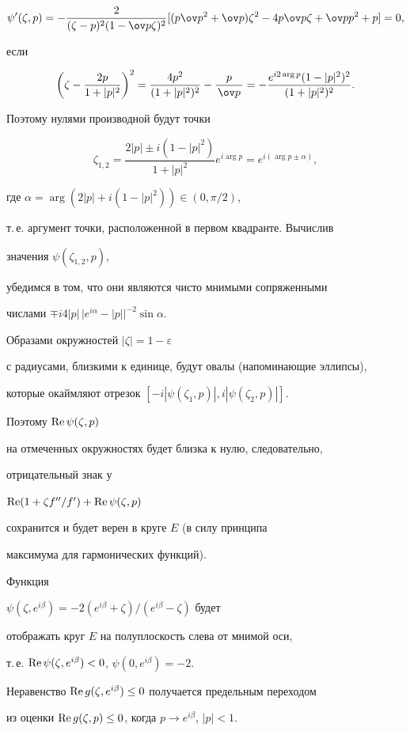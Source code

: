 \begin{pf}
$$ 


\psi'(\zeta,p)=-\frac{2}{(\zeta-p)^2(1-\ov p\zeta)^2} 


[(p\ov p{}^2+\ov p)\zeta^2-4p\ov p\zeta+ 


\ov p p^2+p]=0, 


$$ 


если 


$$ 


\bigg(\zeta-\frac{2p}{1+|p|^2} \bigg)^2= 


\frac{4p^2}{(1+|p|^2)^2}-\frac{p}{\,\ov p\,}=- 


\frac{e^{i2\arg p}(1-|p|^2)^2}{(1+|p|^2)^2}. 


$$ 


Поэтому нулями производной будут точки 


$$ 


\zeta_{1,2}=\frac{2|p|\pm i(1-|p|^2)}{1+|p|^2} 


e^{i\arg p}=e^{i(\arg p\pm\alpha)}, 


$$ 


где $\alpha=\arg(2|p|+i(1-|p|^2))\in(0,\pi/2)$, 


т.\,е. аргумент точки, расположенной в первом квадранте. Вычислив 


значения $\psi(\zeta_{1,2},p)$, 


убедимся в том, что они являются чисто мнимыми сопряженными 


числами $\mp i4|p|\,\big|e^{i\alpha}-|p|\big|^{-2}\sin\alpha$. 


 


Образами окружностей $|\zeta|=1-\varepsilon$ 


с радиусами, близкими к единице, будут овалы (напоминающие эллипсы), 


которые окаймляют отрезок $[-i|\psi(\zeta_1,p)|,i|\psi(\zeta_2,p)|]$. 


Поэтому $\operatorname{Re}\psi(\zeta,p)$ 


на отмеченных окружностях будет близка к нулю, следовательно, 


отрицательный знак у 


$\operatorname{Re}(1+\zeta f''/f')+ \operatorname{Re}\psi(\zeta,p)$ 


сохранится и будет верен в круге $E$ (в силу принципа 


максимума для гармонических функций). 


 


Функция 


$\psi(\zeta,e^{i\beta})=-2(e^{i\beta}+\zeta)/(e^{i\beta}-\zeta)$ будет 


отображать круг $E$ на полуплоскость слева от мнимой оси, 


т.\,е. $\operatorname{Re}\psi(\zeta,e^{i\beta})<0$, $\psi(0,e^{i\beta})=-2$. 


Неравенство $\operatorname{Re} g(\zeta,e^{i\beta})\le0$ получается предельным переходом 


из оценки $\operatorname{Re} g(\zeta,p)\le0$, когда $p\to e^{i\beta}$, $|p|<1$. 


\end{pf} 


